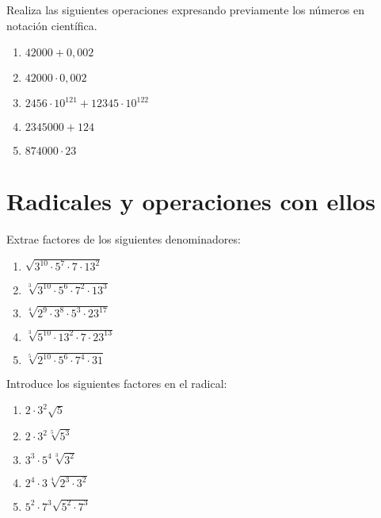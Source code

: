 \Exercicio Realiza las siguientes operaciones expresando previamente los números en notación científica.
\begin{enumerate}
	\item $42 000 + 0,002$
	\item $42 000 \cdot 0,002$
	\item $2456 \cdot 10^{121} + 12345 \cdot 10^{122}$
	\item $2345000 +  124$
	\item $874000 \cdot 23$ 
\end{enumerate}

\section{Radicales y operaciones con ellos}

\Exercicio Extrae factores de los siguientes denominadores:

\begin{enumerate}[topsep=0pt]

	\item $ \sqrt{3^{10} \cdot 5^7 \cdot 7 \cdot 13^2}$

	\item $ \sqrt[3]{3^{10} \cdot 5^6 \cdot 7^2 \cdot 13^3} $
	\item $ \sqrt[4]{2^{9} \cdot 3^8 \cdot 5^3 \cdot 23^{17}} $
	\item $ \sqrt[3]{5^{10} \cdot 13^2 \cdot 7 \cdot 23^{13}} $
	\item $ \sqrt[5]{2^{10} \cdot 5^6 \cdot 7^4 \cdot 31} $


\end{enumerate}



\Exercicio Introduce los siguientes factores en el radical:

\begin{enumerate}[topsep=0pt]

	\item $ 2 \cdot 3^2 \sqrt{5}$

	\item $ 2 \cdot 3^2 \sqrt[5]{5^3}$
	\item $ 3^3 \cdot 5^4 \sqrt[3]{3^2}$
	\item $ 2^4 \cdot 3 \sqrt[4]{2^3 \cdot 3^2}$
	\item $ 5^2 \cdot 7^3 \sqrt{5^2 \cdot 7^3}$

\end{enumerate}



